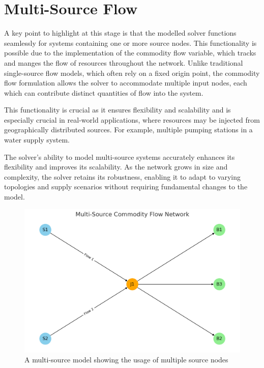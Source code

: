 \section{Multi-Source Flow}
A key point to highlight at this stage is that the modelled solver functions seamlessly for systems containing one or more source nodes. This functionality is possible due to the implementation of the commodity flow variable, which tracks and manges the flow of resources throughout the network. Unlike traditional single-source flow models, which often rely on a fixed origin point, the commodity flow formulation allows the solver to accommodate multiple input nodes, each which can contribute distinct quantities of flow into the system.\newline

This functionality is crucial as it ensures flexibility and scalability and is especially crucial in real-world applications, where resources may be injected from geographically distributed sources. For example, multiple pumping stations in a water supply system.\newline

The solver's ability to model multi-source systems accurately enhances its flexibility and improves its scalability. As the network grows in size and complexity, the solver retains its robustness, enabling it to adapt to varying topologies and supply scenarios without requiring fundamental changes to the model.

\begin{figure}
    \centering
    \includegraphics[width=0.5\linewidth]{multisource.png}
    \caption{A multi-source model showing the usage of multiple source nodes}
    \label{fig:multisource}
\end{figure}

